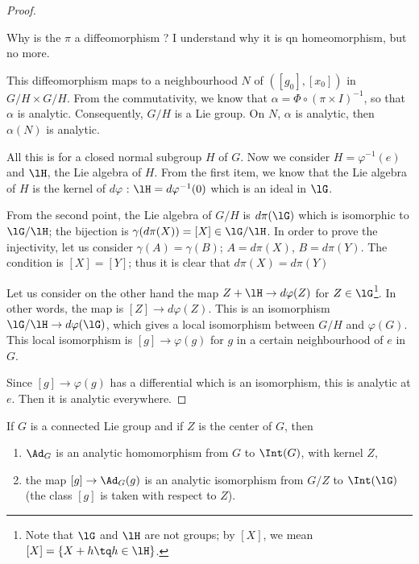 \begin{proof}
\begin{probleme}\label{prob:diffeo_2}
    Why is the \( \pi\) a diffeomorphism ? I understand why it is qn homeomorphism, but no more.
\end{probleme}

This diffeomorphism maps to a neighbourhood $N$ of $([g_0],[x_0])$ in $G/H\times G/H$. From the commutativity, we know that $\alpha=\Phi\circ(\pi\times I)^{-1}$, so that $\alpha$ is analytic. Consequently, $G/H$ is a Lie group. On $N$, $\alpha$ is analytic, then $\alpha(N)$ is analytic.

All this is for a closed normal subgroup $H$ of $G$. Now we consider $H=\varphi^{-1}(e)$ and $\lH$, the Lie algebra of $H$. From the first item, we know that the Lie algebra of $H$ is the kernel of $d\varphi$ : $\lH=d\varphi^{-1}(0)$ which is an ideal in $\lG$.

From the second point, the Lie algebra of $G/H$ is $d\pi(\lG)$ which is isomorphic to $\lG/\lH$; the bijection is $\gamma(d\pi(X))=[X]\in\lG/\lH$. In order to prove the injectivity, let us consider $\gamma(A)=\gamma(B)$; $A=d\pi(X)$, $B=d\pi(Y)$. The condition is $[X]=[Y]$; thus it is clear that $d\pi(X)=d\pi(Y)$

Let us consider on the other hand the map $Z+\lH\to d\varphi(Z)$ for $Z\in\lG$\footnote{Note that $\lG$ and $\lH$ are not groups; by $[X]$, we mean $[X]=\{ X+h\tq h\in\lH \}$.}. In other words, the map is $[Z]\to d\varphi(Z)$. This is an isomorphism $\lG/\lH\to d\varphi(\lG)$, which gives a local isomorphism between $G/H$ and $\varphi(G)$. This local isomorphism is $[g]\to\varphi(g)$ for $g$ in a certain neighbourhood of $e$ in $G$.

Since $[g]\to\varphi(g)$ has a differential which is an isomorphism, this is analytic at $e$. Then it is analytic everywhere.

\end{proof}


\begin{corollary}
If $G$ is a connected Lie group and if $Z$ is the center of $G$, then
\begin{enumerate}
\item $\Ad_G$ is an analytic homomorphism from $G$ to $\Int(G)$, with kernel $Z$,
\item the map $[g]\to\Ad_G(g)$ is an analytic isomorphism from $G/Z$ to $\Int(\lG)$ (the class $[g]$ is taken with respect to $Z$).
\end{enumerate}
\label{cor:Ad_homom}
\end{corollary}
    

